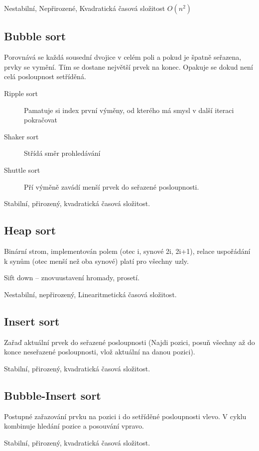 \documentclass[a4paper, 11pt]{report}
\begin{document}
Nestabilní, Nepřirozené, Kvadratická časová složitost $O(n^2)$

\subsection{Bubble sort}
Porovnává se každá sousední dvojice v celém poli a pokud je špatně seřazena, prvky se vymění. Tím se dostane největší prvek na konec. Opakuje se dokud není celá posloupnost setříděná.

\begin{description}
	\item[Ripple sort] Pamatuje si index první výměny, od kterého má smysl v další iteraci pokračovat
	\item[Shaker sort] Střídá směr prohledávání
	\item[Shuttle sort] Pří výměně zavádí menší prvek do seřazené posloupnosti.
\end{description}

Stabilní, přirozený, kvadratická časová složitost.

\subsection{Heap sort}

Binární strom, implementován polem (otec i, synové 2i, 2i+1), relace uspořádání k synům (otec menší než oba synové) platí pro všechny uzly.

Sift down -- znovuustavení hromady, prosetí.

Nestabilní, nepřirozený, Linearitmetická časová složitost.

\subsection{Insert sort}
Zařaď aktuální prvek do seřazené posloupnosti (Najdi pozici, posuň všechny až do konce neseřazené posloupnosti, vlož aktuální na danou pozici).

Stabilní, přirozený, kvadratická časová složitost.

\subsection{Bubble-Insert sort}
Postupné zařazování prvku na pozici i do setříděné posloupnosti vlevo. V cyklu kombinuje hledání pozice a posouvání vpravo.

Stabilní, přirozený, kvadratická časová složitost.
\end{document}
